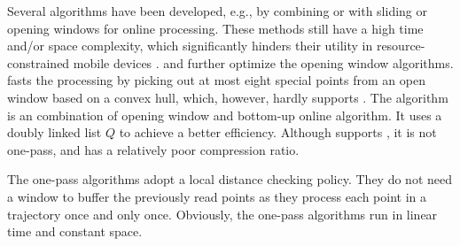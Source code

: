 Several \lsa algorithms have been developed, e.g., by combining \dpa or \pavlidis with sliding or opening windows for online processing\cite{Meratnia:Spatiotemporal}. %
These methods still have a high time and/or space complexity, which significantly hinders their utility in resource-constrained mobile devices \cite{Liu:BQS}.
%
\bqsa \cite{Liu:BQS, Liu:Amnesic} and \squishe\cite{Muckell:Compression} further optimize the opening window algorithms.
%
\bqsa \cite{Liu:BQS, Liu:Amnesic} fasts the processing by picking out at most eight special points from an open window based on a convex hull, which, however, hardly supports \sed.
The \squishe\cite{Muckell:Compression} algorithm is an combination of {opening} window and bottom-up online algorithm. It uses a doubly linked list $Q$ to achieve a better efficiency. Although \squishe supports \sed, it is not one-pass, and has a relatively poor compression ratio.

The one-pass algorithms adopt a local distance checking policy.
They do not need a window to buffer the previously read points as they process each point in a trajectory once and only once.
Obviously, the one-pass algorithms run in linear time and constant space.
%

